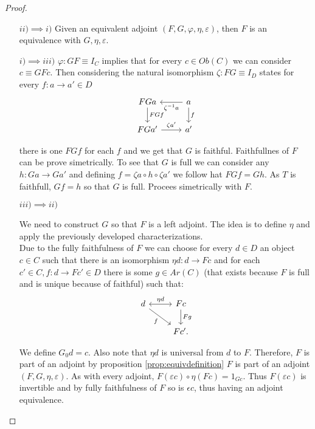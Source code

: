   \begin{proof}\
    \

    
    \begin{itemize}
    \item[$ii)\implies i)$] Given an equivalent adjoint $(F,G,\varphi,\eta,\varepsilon)$, then $F$ is an equivalence with $G,\eta,\varepsilon$. 
    \item[$i)\implies iii)$] $\varphi: GF\equiv I_C$ implies that for every $c\in Ob(C)$ we can consider $c\equiv GFc$. Then considering the natural isomorphism $\zeta: FG\equiv I_D$ states for every $f:a\to a'\in D$
\[
\begin{tikzcd}
  FGa \arrow{d}{FG f}& a\arrow{d}{f}\arrow{l}{\zeta^{-1} a}\\
  FGa' \arrow{r}{\zeta a'}& a'
\end{tikzcd}
\]

 there is one $FG f$ for each $f$ and we get that $G$ is faithful. Faithfullnes of $F$ can be prove simetrically. To see that $G$ is full we can consider any $h:Ga\to Ga'$ and defining $f=\zeta a\circ h \circ \zeta a'$ we follow hat $FG f = Gh$. As $T$ is faithfull, $Gf=h$ so that $G$ is full. Procees simetrically with $F$.  
\item[$iii)\implies ii)$]


  We need to construct $G$ so that $F$ is a left adjoint. The idea is to define $\eta$ and apply the previously developed characterizations.\\


  Due to the fully faithfulness of $F$ we can choose for every $d\in D$ an object $c\in C$ such that there is an isomorphism $\eta d: d \to Fc$ and for each $c'\in C, f:d\to Fc'\in D$ there is some $g\in Ar(C)$ (that exists because $F$ is full and is unique because of faithful) such that:
\[
\begin{tikzcd}
  d\arrow[leftrightarrow]{r}{\eta d}\arrow[swap]{dr}{f}& Fc\arrow{d}{Fg}\\
  & Fc'.
\end{tikzcd} 
\]  

We define $G_0d = c$. Also note  that $\eta d$ is universal from $d$ to $F$. Therefore, $F$ is part of an adjoint by proposition \ref{prop:equivdefinition} $F$ is part of an adjoint $(F,G,\eta, \varepsilon)$. As with every adjoint, $F (\varepsilon c)\circ \eta (Fc) =1_{Gc}$. Thus $F(\varepsilon c)$ is invertible and by  fully faithfulness of $F$ so is $\epsilon c$, thus having an adjoint equivalence.




\end{itemize}
\end{proof}


